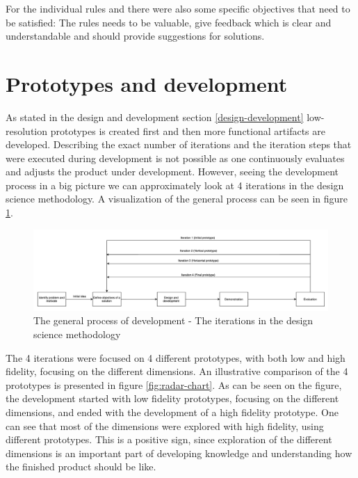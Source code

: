\documentclass{report}
\begin{document}
For the individual rules and there were also some specific objectives that need to be satisfied: The rules needs to be valuable, give feedback which is clear and understandable and should provide suggestions for solutions.

\section{Prototypes and development}
\label{on-prototypes}
As stated in the design and development section \ref{design-development} low-resolution 
prototypes is created first and then more functional artifacts are developed. Describing the exact number of iterations and the iteration steps that were executed during development is not possible as one continuously evaluates and adjusts the product under development. However, seeing the development process in a big picture we can approximately look at 4 iterations in the design science methodology. A visualization of the general process can be seen in figure \ref{fig:workflow}.

\begin{figure}[h!]
    \centering
    \includegraphics[width=\linewidth]{../images/workflow.png}
    \caption{The general process of development - The iterations in the design science methodology}
    \label{fig:workflow}
\end{figure}

The 4 iterations were focused on 4 different prototypes, with both low and high fidelity, focusing on the different dimensions. An illustrative comparison of the 4 prototypes is presented in figure \ref{fig:radar-chart}. As can be seen on the figure, the development started with low fidelity prototypes, focusing on the different dimensions, and ended with the development of a high fidelity prototype. One can see that most of the dimensions were explored with high fidelity, using different prototypes. This is a positive sign, since exploration of the different dimensions is an important part of developing knowledge and understanding how the finished product should be like. 
\end{document}
